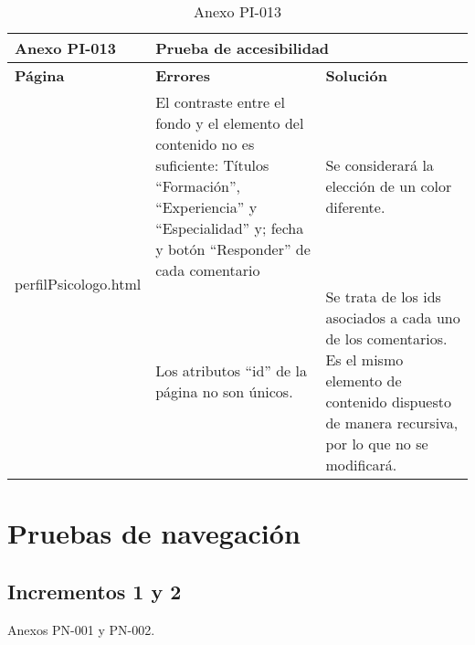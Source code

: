 \begin{table}[htpb]
\centering
\begin{tabularx}{\textwidth}{|l|X|X|}
\hline
\rowcolor[gray]{0.9}\textbf{Anexo PI-013} & \multicolumn{2}{l|}{\textbf{Prueba de accesibilidad}}                                                                                                                                                                                                                                                                                 \\ \hline
\textbf{Página}       & \textbf{Errores}                                                                                                                                                         & \textbf{Solución}                                                                                                                                          \\ \hline
\multirow{2}{*}{perfilPsicologo.html}  & El contraste entre el fondo y el elemento del contenido no es suficiente: Títulos “Formación”, “Experiencia” y “Especialidad” y; fecha y botón “Responder” de cada comentario & Se considerará la elección de un color diferente.                                                                                                          \\ \cline{2-3} 
                      & Los atributos “id” de la página no son únicos.                                                                                                                           & Se trata de los ids asociados a cada uno de los comentarios. Es el mismo elemento de contenido dispuesto de manera recursiva, por lo que no se modificará. \\ \hline
\end{tabularx}
\caption{Anexo PI-013}
\end{table}


\section{Pruebas de navegación}

\subsection{Incrementos 1 y 2}
Anexos PN-001 y PN-002.

